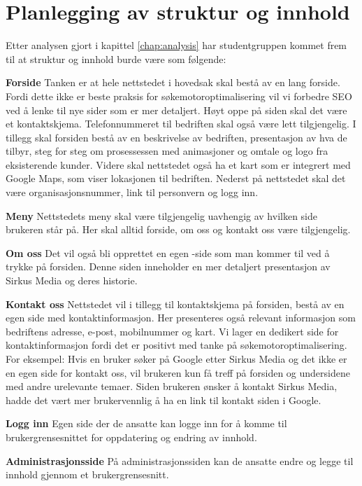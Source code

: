 \clearpage

\section{Planlegging av struktur og innhold}

Etter analysen gjort i kapittel \ref{chap:analysis} har studentgruppen kommet frem til at struktur og innhold burde være som følgende: 

\textbf{Forside} Tanken er at hele nettstedet i hovedsak skal bestå av en lang forside. Fordi dette ikke er beste praksis for søkemotoroptimalisering vil vi forbedre SEO ved å lenke til nye sider som er mer detaljert. Høyt oppe på siden skal det være et kontaktskjema. Telefonnummeret til bedriften skal også være lett tilgjengelig. I tillegg skal forsiden bestå av en beskrivelse av bedriften, presentasjon av hva de tilbyr, steg for steg om prosessessen med animasjoner og omtale og logo fra eksisterende kunder. Videre skal nettstedet også ha et kart som er integrert med Google Maps, som viser lokasjonen til bedriften. Nederst på nettstedet skal det være organisasjonsnummer, link til personvern og logg inn.

\textbf{Meny} Nettstedets meny skal være tilgjengelig uavhengig av hvilken side brukeren står på. Her skal alltid forside, om oss og kontakt oss være tilgjengelig. 

\textbf{Om oss} Det vil også bli opprettet en egen -side som man kommer til ved å trykke  på forsiden. Denne siden inneholder en mer detaljert presentasjon av Sirkus Media og deres historie.

\textbf{Kontakt oss} Nettstedet vil i tillegg til kontaktskjema på forsiden, bestå av en egen side med kontaktinformasjon. Her presenteres også relevant informasjon som bedriftens adresse, e-post, mobilnummer og kart. Vi lager en dedikert side for kontaktinformasjon fordi det er positivt med tanke på søkemotoroptimalisering. For eksempel: Hvis en bruker søker på Google etter Sirkus Media og det ikke er en egen side for kontakt oss, vil brukeren kun få treff på forsiden og undersidene med andre urelevante temaer. Siden brukeren ønsker å kontakt Sirkus Media,  hadde det vært mer brukervennlig å ha en link til kontakt siden i Google.

\textbf{Logg inn} Egen side der de ansatte kan logge inn for å komme til brukergrensesnittet for oppdatering og endring av innhold.

\textbf{Administrasjonsside}  På administrasjonssiden kan de ansatte endre og legge til innhold gjennom et brukergrensesnitt.

